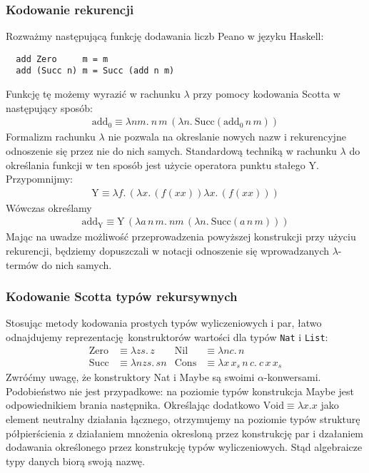 \subsubsection{Kodowanie rekurencji}
 Rozważmy następującą funkcję dodawania liczb Peano w języku Haskell:
\begin{verbatim}
  add Zero     m = m
  add (Succ n) m = Succ (add n m)
\end{verbatim}
Funkcję tę możemy wyrazić w rachunku \(\lambda\) przy pomocy kodowania Scotta w następujący sposób:
\begin{align*}
  \mathrm{add_0} \equiv \lambda n m.\:n\,m\,(\lambda n.\:\mathrm{Succ}(\mathrm{add_0}\,n\,m))
\end{align*}
Formalizm rachunku \(\lambda\) nie pozwala na okreslanie nowych nazw i rekurencyjne odnoszenie się przez nie do nich samych. Standardową techniką w rachunku \(\lambda\) do określania funkcji w ten sposób jest użycie operatora punktu stałego Y. Przypomnijmy:
\begin{align*}
  \mathrm{Y}\equiv\lambda f.\,(\lambda x.\,(f(xx))\lambda x.\,(f(xx)))
\end{align*}
Wówczas określamy
\begin{align*}
  \mathrm{add_Y}\equiv \mathrm{Y}\,(\lambda a\,n\, m .\ n m\,(\lambda n.\ \mathrm{Succ} (a\,n\,m)))
\end{align*}
Mając na uwadze możliwość przeprowadzenia powyższej konstrukcji przy użyciu rekurencji, będziemy dopuszczali w notacji odnoszenie się wprowadzanych \(\lambda\)-termów do nich samych.

\subsubsection{Kodowanie Scotta typów rekursywnych}
Stosując metody kodowania prostych typów wyliczeniowych i par, łatwo odnajdujemy reprezentację konstruktorów wartości dla typów \texttt{Nat} i \texttt{List}:
\begin{align*}
  \mathrm{Zero} &\equiv \lambda z s .\, z     & \mathrm{Nil} &\equiv \lambda n c.\,n\\
  \mathrm{Succ} &\equiv \lambda n z s.\,sn    & \mathrm{Cons} &\equiv \lambda x \, x_s \, n\, c.\ c \, x \, x_s
\end{align*}
  Zwróćmy uwagę, że konstruktory Nat i Maybe są swoimi \(\alpha\)-konwersami. Podobieństwo nie jest przypadkowe: na poziomie typów konstrukcja Maybe jest odpowiednikiem brania następnika. Określając dodatkowo \(\mathrm{Void}\equiv\lambda x.x\) jako element neutralny działania łącznego, otrzymujemy na poziomie typów strukturę półpierścienia z działaniem mnożenia okresloną przez konstrukcję par i dzałaniem dodawania określonego przez konstrukcję typów wyliczeniowych. Stąd algebraicze typy danych biorą swoją nazwę.

